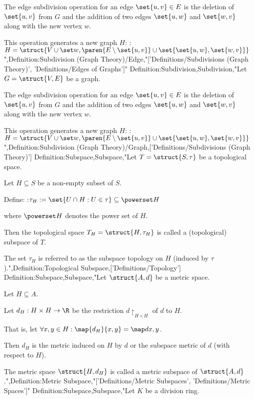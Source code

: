 The edge subdivision operation for an edge $\set {u, v} \in E$ is the deletion of $\set {u, v}$ from $G$ and the addition of two edges $\set {u, w}$ and $\set {w, v}$ along with the new vertex $w$. 


This operation generates a new graph $H$:
:$H = \struct {V \cup \set w, \paren {E \setminus \set {u, v} } \cup \set {\set {u, w}, \set {w, v} } }$",Definition:Subdivision (Graph Theory)/Edge,"['Definitions/Subdivisions (Graph Theory)', 'Definitions/Edges of Graphs']"
Definition:Subdivision,Subdivision,"Let $G = \struct {V, E}$ be a graph.


The edge subdivision operation for an edge $\set {u, v} \in E$ is the deletion of $\set {u, v}$ from $G$ and the addition of two edges $\set {u, w}$ and $\set {w, v}$ along with the new vertex $w$. 


This operation generates a new graph $H$:
:$H = \struct {V \cup \set w, \paren {E \setminus \set {u, v} } \cup \set {\set {u, w}, \set {w, v} } }$
",Definition:Subdivision (Graph Theory)/Graph,['Definitions/Subdivisions (Graph Theory)']
Definition:Subspace,Subspace,"Let $T = \struct {S, \tau}$ be a topological space.

Let $H \subseteq S$ be a non-empty subset of $S$.


Define:
:$\tau_H := \set {U \cap H: U \in \tau} \subseteq \powerset H$

where $\powerset H$ denotes the power set of $H$.


Then the topological space $T_H = \struct {H, \tau_H}$ is called a (topological) subspace of $T$.


The set $\tau_H$ is referred to as the subspace topology on $H$ (induced by $\tau$).",Definition:Topological Subspace,['Definitions/Topology']
Definition:Subspace,Subspace,"Let $\struct {A, d}$ be a metric space.

Let $H \subseteq A$.

Let $d_H: H \times H \to \R$ be the restriction $d \restriction_{H \times H}$ of $d$ to $H$.

That is, let $\forall x, y \in H: \map {d_H} {x, y} = \map d {x, y}$.


Then $d_H$ is the metric induced on $H$ by $d$ or the subspace metric of $d$ (with respect to $H$).


The metric space $\struct {H, d_H}$ is called a metric subspace of $\struct {A, d}$.",Definition:Metric Subspace,"['Definitions/Metric Subspaces', 'Definitions/Metric Spaces']"
Definition:Subspace,Subspace,"Let $K$ be a division ring.

